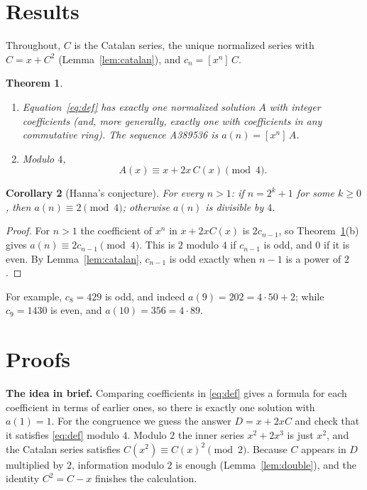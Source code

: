 \documentclass[11pt,a4paper]{article}
\newtheorem{theorem}{Theorem}[section]
\newtheorem{corollary}[theorem]{Corollary}
\theoremstyle{definition}
\theoremstyle{remark}
\newcommand{\coeff}[2]{[x^{#1}]\,#2}
\newcommand{\para}[1]{\par\medskip\noindent\textbf{#1}\enspace}
\begin{document}
\section{Results}\label{sec:results}

Throughout, $C$ is the Catalan series, the unique normalized series with $C=x+C^2$ (Lemma~\ref{lem:catalan}), and
$c_n=\coeff{n}{C}$.

\begin{theorem}\label{thm:main}
\begin{enumerate}[label=(\alph*)]
\item Equation~\eqref{eq:def} has exactly one normalized solution $A$ with integer coefficients (and, more generally,
exactly one with coefficients in any commutative ring). The sequence A389536 is $a(n)=\coeff{n}{A}$.
\item Modulo $4$,
\[
A(x)\equiv x+2x\,C(x)\pmod 4 .
\]
\end{enumerate}
\end{theorem}

\begin{corollary}[Hanna's conjecture]\label{cor:conj}
For every $n>1$: if $n=2^k+1$ for some $k\ge0$, then $a(n)\equiv2\pmod4$; otherwise $a(n)$ is divisible by $4$.
\end{corollary}

\begin{proof}
For $n>1$ the coefficient of $x^n$ in $x+2xC(x)$ is $2c_{n-1}$, so Theorem~\ref{thm:main}(b) gives
$a(n)\equiv2c_{n-1}\pmod4$. This is $2$ modulo $4$ if $c_{n-1}$ is odd, and $0$ if it is even. By
Lemma~\ref{lem:catalan}, $c_{n-1}$ is odd exactly when $n-1$ is a power of $2$.
\end{proof}

For example, $c_8=429$ is odd, and indeed $a(9)=202=4\cdot50+2$; while $c_9=1430$ is even, and $a(10)=356=4\cdot89$.

\section{Proofs}\label{sec:proofs}

\para{The idea in brief.} Comparing coefficients in \eqref{eq:def} gives a formula for each coefficient in terms of
earlier ones, so there is exactly one solution with $a(1)=1$. For the congruence we guess the answer $D=x+2xC$ and check
that it satisfies \eqref{eq:def} modulo $4$. Modulo $2$ the inner series $x^2+2x^3$ is just $x^2$, and the Catalan series
satisfies $C(x^2)\equiv C(x)^2\pmod 2$. Because $C$ appears in $D$ multiplied by $2$, information modulo $2$ is enough
(Lemma~\ref{lem:double}), and the identity $C^2=C-x$ finishes the calculation.
\end{document}
